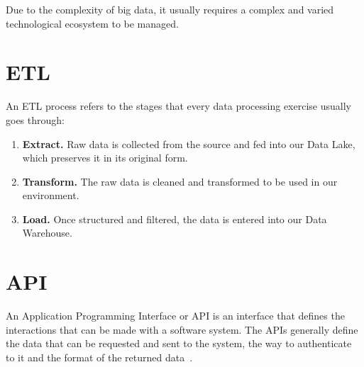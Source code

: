 \nonzeroparskip Due to the complexity of big data, it usually requires a complex and varied technological ecosystem to be managed.

\section{ETL}
\nonzeroparskip An ETL process refers to the stages that every data processing exercise usually goes through:
\begin{enumerate}
	\item \textbf{Extract.} Raw data is collected from the source and fed into our Data Lake, which preserves it in its original form.
	\item \textbf{Transform.} The raw data is cleaned and transformed to be used in our environment.
	\item \textbf{Load.} Once structured and filtered, the data is entered into our Data Warehouse.
\end{enumerate}

\section{API}

\nonzeroparskip An Application Programming Interface or API is an interface that defines the interactions that can be made with a software system. The APIs generally define the data that can be requested and sent to the system, the way to authenticate to it and the format of the returned data~\cite{ibm_restapi}.

